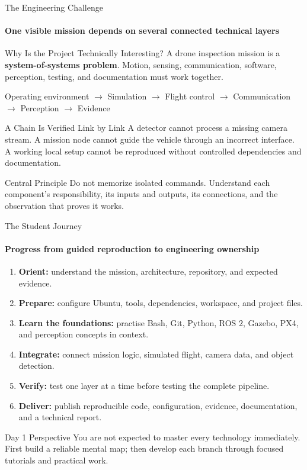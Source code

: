 \begin{frame}{The Engineering Challenge}
\framesubtitle{One visible mission depends on several connected technical layers}
\footnotesize
\begin{block}{Why Is the Project Technically Interesting?}
A drone inspection mission is a \textbf{system-of-systems problem}. Motion, sensing, communication, software, perception, testing, and documentation must work together.
\end{block}
\begin{center}
\scriptsize
Operating environment
$\rightarrow$
Simulation
$\rightarrow$
Flight control
$\rightarrow$
Communication
$\rightarrow$
Perception
$\rightarrow$
Evidence
\end{center}
\pause
\begin{alertblock}{A Chain Is Verified Link by Link}
A detector cannot process a missing camera stream. A mission node cannot guide the vehicle through an incorrect interface. A working local setup cannot be reproduced without controlled dependencies and documentation.
\end{alertblock}
\begin{exampleblock}{Central Principle}
Do not memorize isolated commands. Understand each component's responsibility, its inputs and outputs, its connections, and the observation that proves it works.
\end{exampleblock}
\end{frame}

\begin{frame}{The Student Journey}
\framesubtitle{Progress from guided reproduction to engineering ownership}
\footnotesize
\begin{enumerate}
    \setlength{\itemsep}{0.35em}
    \item \textbf{Orient:} understand the mission, architecture, repository, and expected evidence.
    \item \textbf{Prepare:} configure Ubuntu, tools, dependencies, workspace, and project files.
    \item \textbf{Learn the foundations:} practise Bash, Git, Python, ROS 2, Gazebo, PX4, and perception concepts in context.
    \item \textbf{Integrate:} connect mission logic, simulated flight, camera data, and object detection.
    \item \textbf{Verify:} test one layer at a time before testing the complete pipeline.
    \item \textbf{Deliver:} publish reproducible code, configuration, evidence, documentation, and a technical report.
\end{enumerate}
\begin{alertblock}{Day 1 Perspective}
You are not expected to master every technology immediately. First build a reliable mental map; then develop each branch through focused tutorials and practical work.
\end{alertblock}
\end{frame}

